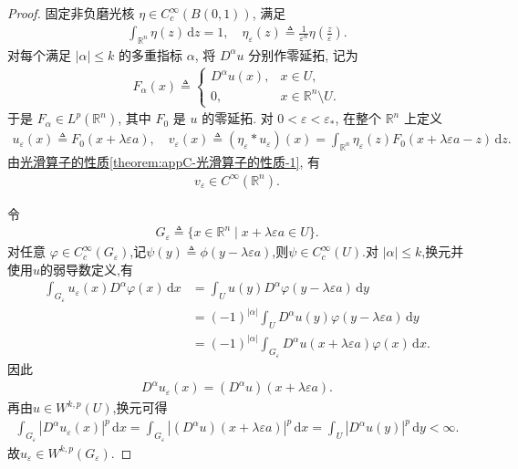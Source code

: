\documentclass[../../main.tex]{subfiles}
\begin{document}
\begin{proof}
固定非负磨光核 $\eta\in C_c^{\infty}(B(0,1))$, 满足
\begin{align*}
\int_{\mathbb{R}^{n}}\eta(z)\,\mathrm{d}z=1,\quad
\eta_{\varepsilon}(z)
\triangleq\frac{1}{\varepsilon^{n}}
\eta\left(\frac{z}{\varepsilon}\right).
\end{align*}
对每个满足 $|\alpha|\leqslant k$ 的多重指标 $\alpha$, 将 $D^{\alpha}u$ 分别作零延拓, 记为
\begin{align*}
F_{\alpha}(x)\triangleq
\begin{cases}
D^{\alpha}u(x),&x\in U,\\
0,&x\in\mathbb{R}^{n}\setminus U.
\end{cases}
\end{align*}
于是 $F_{\alpha}\in L^{p}(\mathbb{R}^{n})$, 其中 $F_0$ 是 $u$ 的零延拓. 
对 $0<\varepsilon<\varepsilon_{*}$, 在整个 $\mathbb{R}^{n}$ 上定义
\begin{align*}
u_{\varepsilon}(x)
\triangleq F_0(x+\lambda\varepsilon a),\quad
v_{\varepsilon}(x)
\triangleq(\eta_{\varepsilon}*u_{\varepsilon})(x)
=\int_{\mathbb{R}^{n}}
\eta_{\varepsilon}(z)
F_0(x+\lambda\varepsilon a-z)\,\mathrm{d}z.
\end{align*}
由\hyperref[theorem:appC-光滑算子的性质]{光滑算子的性质\ref{theorem:appC-光滑算子的性质-1}}, 有
\begin{align}
v_{\varepsilon}\in C^{\infty}(\mathbb{R}^{n}).\label{dsjfiosjaiojio2jioewj}
\end{align}

令
\begin{align*}
G_{\varepsilon}
\triangleq\{x\in\mathbb{R}^{n}\mid x+\lambda\varepsilon a\in U\}.
\end{align*}
对任意
$\varphi\in C_c^{\infty}(G_{\varepsilon})$,记$\psi(y)\triangleq \phi(y-\lambda\varepsilon a)$,则$\psi \in C_c^\infty(U)$.对 $|\alpha|\leqslant k$,换元并使用$u$的弱导数定义,有
\begin{align*}
\int_{G_{\varepsilon}}
u_{\varepsilon}(x)D^{\alpha}\varphi(x)\,\mathrm{d}x
&=\int_U
u(y)D^{\alpha}\varphi(y-\lambda\varepsilon a)\,\mathrm{d}y\\
&=(-1)^{|\alpha|}
\int_U
D^{\alpha}u(y)\varphi(y-\lambda\varepsilon a)\,\mathrm{d}y\\
&=(-1)^{|\alpha|}
\int_{G_{\varepsilon}}
D^{\alpha}u(x+\lambda\varepsilon a)
\varphi(x)\,\mathrm{d}x.
\end{align*}
因此
\begin{align}\label{eq::NIOUHNANNZZZMVBZMNX}
D^{\alpha}u_{\varepsilon}(x)
=(D^{\alpha}u)(x+\lambda\varepsilon a).
\end{align}
再由$u\in W^{k,p}(U)$,换元可得
\begin{align*}
\int_{G_{\varepsilon}}
|D^{\alpha}u_{\varepsilon}(x)|^p\,\mathrm{d}x
=
\int_{G_{\varepsilon}}
|(D^{\alpha}u)(x+\lambda\varepsilon a)|^p\,\mathrm{d}x=
\int_U |D^{\alpha}u(y)|^p\,\mathrm{d}y
<\infty.
\end{align*}
故$u_{\varepsilon}\in W^{k,p}(G_{\varepsilon}).$


\end{proof}
\end{document}

